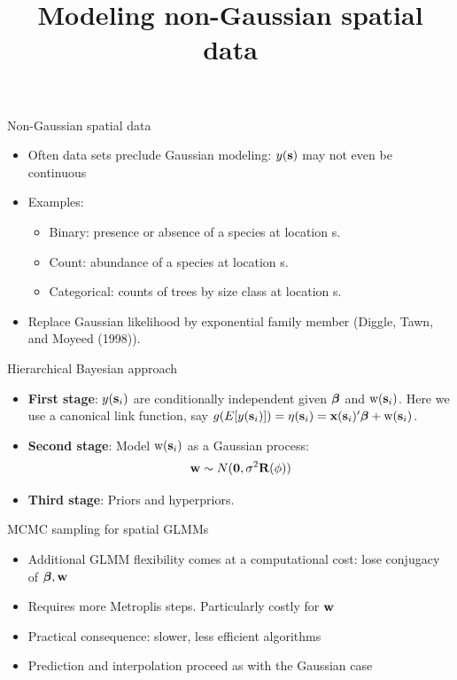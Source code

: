 



\title[]{Modeling non-Gaussian spatial data}




\maketitle

\begin{frame}{Non-Gaussian spatial data}

\begin{itemize}
	\item Often data sets preclude Gaussian modeling: $y(\textbf{s})$ may not even be continuous
        \item Examples: 
             \begin{itemize}
		     \item Binary: presence or absence of a species at location s.
                     \item Count: abundance of a species at location s.
                     \item Categorical: counts of trees by size class at location s.  
             \end{itemize}
     \item Replace Gaussian likelihood by exponential family member (Diggle, Tawn, and Moyeed (1998)).
\end{itemize}
\end{frame}
 

\begin{frame}{Hierarchical Bayesian approach}
     \begin{itemize}
	     \item \textbf{First stage}: $y(\textbf{s}_i)$ are conditionally independent given
		     $\mbox{\boldmath $ \beta $}$ and $\text{w}(\textbf{s}_i)$. Here we use a canonical link function, say $g(E[y(\textbf{s}_i)]) = \eta(\textbf{s}_i) =\textbf{x}(\textbf{s}_i)'\mbox{\boldmath $ \beta $}+\text{w}(\textbf{s}_i)$. \pause
	     \item \textbf{Second stage}: Model $\text{w}(\textbf{s}_i)$ as a Gaussian process:
		     $$ \textbf{w} \sim N(\textbf{0},\sigma^2\textbf{R}(\phi))$$ \pause
	     \item \textbf{Third stage}: Priors and hyperpriors.
     \end{itemize}

\end{frame}

\begin{frame}{MCMC sampling for spatial GLMMs}
     \begin{itemize}
	     \item Additional GLMM flexibility comes at a computational cost: lose conjugacy of $\mbox{\boldmath $ \beta $}, \textbf{w}$
	     \item Requires more Metroplis steps. Particularly costly for $\textbf{w}$
	     \item Practical consequence: slower, less efficient algorithms
	     \item Prediction and interpolation proceed as with the Gaussian case
     \end{itemize}
\end{frame}

